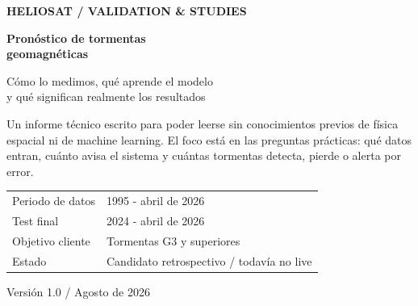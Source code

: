 \documentclass[10pt,a4paper]{article}
\begin{document}
\hypersetup{pageanchor=false}
\begin{titlepage}
\color{white}
\vspace*{12mm}
{\small\bfseries\color{Cyan}HELIOSAT / VALIDATION \& STUDIES}\par
\vspace{32mm}
{\fontsize{30}{34}\selectfont\bfseries Pronóstico de tormentas\\geomagnéticas}\par
\vspace{7mm}
{\Large\color{white!78}Cómo lo medimos, qué aprende el modelo\\y qué significan realmente los resultados}\par
\vspace{14mm}
\colorbox{Navy!75!white}{\parbox{0.72\textwidth}{\color{white}\small\vspace{2mm}Un informe técnico escrito para poder leerse sin conocimientos previos de física espacial ni de machine learning. El foco está en las preguntas prácticas: qué datos entran, cuánto avisa el sistema y cuántas tormentas detecta, pierde o alerta por error.\vspace{2mm}}}
\vfill
\begin{tabular}{@{}ll@{}}
\color{white!55}\small Periodo de datos & \color{white}\small 1995 - abril de 2026\\
\color{white!55}\small Test final & \color{white}\small 2024 - abril de 2026\\
\color{white!55}\small Objetivo cliente & \color{white}\small Tormentas G3 y superiores\\
\color{white!55}\small Estado & \color{white}\small Candidato retrospectivo / todavía no live\\
\end{tabular}
\vspace{11mm}
{\footnotesize\color{white!50}Versión 1.0 / Agosto de 2026}
\end{titlepage}
\hypersetup{pageanchor=true}
\end{document}

